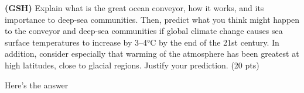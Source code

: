 \documentclass[11pt]{exam}
\begin{document}
\begin{questions}
\newpage

\question[20]
\textbf{(GSH)} Explain what is the great ocean conveyor, how it works, and its importance to deep-sea communities.  Then, predict what you think might happen to the conveyor and deep-sea communities if global climate change causes sea surface temperatures to increase by 3–4°C by the end of the 21st century. In addition, consider especially that warming of the atmosphere has been greatest at high latitudes, close to glacial regions. Justify your prediction. (20 pts)

\begin{solution}
Here's the answer
\end{solution}

\end{questions}
\end{document}
